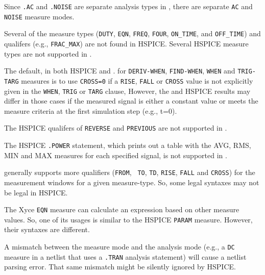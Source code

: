 \begin{XyceItemize}
  \item Since \texttt{.AC} and \texttt{.NOISE} are separate analysis types in
        \Xyce{}, there are separate \texttt{AC} and \texttt{NOISE} measure modes.

  \item Several of the \Xyce{} measure types ({\tt DUTY}, {\tt EQN},
         {\tt FREQ}, {\tt FOUR}, {\tt ON\_TIME}, and {\tt OFF\_TIME})
         and qualifers (e.g., {\tt FRAC\_MAX}) are not found in
         HSPICE.  Several HSPICE measure types are not supported
         in \Xyce{}.

  \item The default, in both HSPICE and \Xyce{}. for {\tt DERIV-WHEN}, {\tt FIND-WHEN},
        {\tt WHEN} and {\tt TRIG-TARG} measures is to use {\tt CROSS=0} if a {\tt RISE},
        {\tt FALL} or {\tt CROSS} value is not explicitly given in the {\tt WHEN}, {\tt TRIG}
        or {\tt TARG} clause,   However, the \Xyce{} and HSPICE results may differ in those
        cases if the measured signal is either a constant value or meets the measure criteria
        at the first simulation step (e.g., t=0).

  \item The HSPICE qualifers of {\tt REVERSE} and {\tt PREVIOUS} are
  not supported in \Xyce{}.

  \item The HSPICE {\tt .POWER} statement, which prints out a table
        with the AVG, RMS, MIN and MAX measures for each specified
        signal, is not supported in \Xyce{}.

  \item \Xyce{} generally supports more qualifiers ({\tt FROM}, {\tt
        TO}, {\tt TD}, {\tt RISE}, {\tt FALL} and {\tt CROSS}) for the
        measurement windows for a given measure-type.  So, some
        legal \Xyce{} syntaxes may not be legal in HSPICE.

  \item The Xyce {\tt EQN} measure can calculate an expression based
        on other measure values.  So, one of its usages is similar to
        the HSPICE {\tt PARAM} measure.  However, their syntaxes are
        different.

  \item A mismatch between the measure mode and the analysis mode
        (e.g., a {\tt DC} measure in a netlist that uses a {\tt .TRAN}
        analysis statement) will cause a \Xyce{} netlist parsing
        error.  That same mismatch might be silently ignored by
        HSPICE.


\end{XyceItemize}
